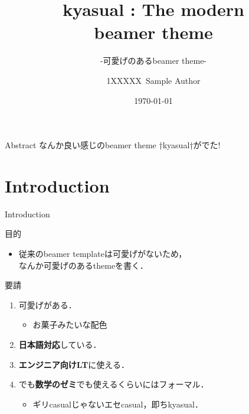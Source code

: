 \documentclass[aspectratio=1610,14pt]{beamer}
\title{%
    kyasual : The modern\\ beamer theme
}
\subtitle{
    -可愛げのあるbeamer theme-
}
\author{%
    1XXXXX\ Sample Author
}
\institute[Sample Univ.]{%
    Sample Univ. 
}
\date{%
    \today
}
\begin{document}
%
%
\begin{frame}
\maketitle 
\end{frame}

\begin{frame}[fragile]{Abstract}
        なんか良い感じのbeamer theme †\alert{kyasual}†がでた!
\end{frame}

\section{Introduction}

\begin{frame}
    \tableofcontents[currentsection]
\end{frame}

\begin{frame}{Introduction}
    \begin{textblock}{目的}
        \begin{itemize}
            \item{従来のbeamer templateは可愛げがないため，\\なんか\alert{可愛げのある}themeを書く．}
        \end{itemize}
    \end{textblock}
    \begin{textblock}{要請}
        \begin{enumerate}
            \item{\alert{可愛げがある．}}
                \begin{itemize}
                    \item{お菓子みたいな配色}
                \end{itemize}
            \item{\textbf{日本語対応}している．}
            \item{\textbf{エンジニア向けLT}に使える．}
            \item{でも\textbf{数学のゼミ}でも使えるくらいには\alert{フォーマル}．}
                \begin{itemize}
                    \item{ギリcasualじゃないエセcasual，即ちkyasual．}
                \end{itemize}
        \end{enumerate}
    \end{textblock}
\end{frame}
\end{document}
